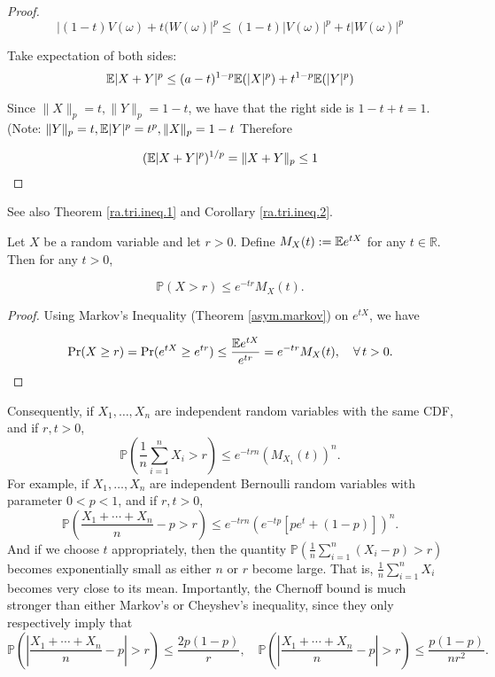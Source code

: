 \begin{itemize}
\begin{itemize}
\begin{theorem}
\begin{proof}
\[
|(1-t)V(\omega) + t(W(\omega)|^p \leq (1-t)|V(\omega)|^p + t|W(\omega)|^p
\]

Take expectation of both sides:
\[
\mathbb{E}|X+Y|^p \leq (a-t)^{1-p}\mathbb{E}(|X|^p) + t^{1-p}\mathbb{E}(|Y|^p)
\]

Since \(\lVert X\rVert_p = t, \lVert Y \rVert_p=1-t\), we have that the right side is \(1 - t + t = 1\). (Note: \(\lVert Y\rVert_p = t, \mathbb{E}|Y|^p = t^p, \lVert X\rVert_p = 1-t\) Therefore

\[
(\mathbb{E}|X+Y|^p)^{1/p} = \lVert X+Y\rVert_p \leq 1
\]

\end{proof}

\begin{remark} See also Theorem \ref{ra.tri.ineq.1} and Corollary \ref{ra.tri.ineq.2}. \end{remark}

\end{theorem}
\end{itemize}

\end{itemize}

\begin{theorem}
Let $X$ be a random variable and let $r>0$.  Define $M_{X}(t):= \mathbb{E} e^{tX}$ for any $t\in\mathbb{R}$. Then for any $t>0$,

\[
\mathbb{P}(X>r)\leq e^{-tr}M_{X}(t).
\]

\end{theorem}

\begin{proof} Using Markov's Inequality (Theorem \ref{asym.markov}) on \(e^{tX}\), we have

\[
\Pr (X\geq r) = \Pr (e^{tX} \geq e^{t r}) \leq \frac{\E e^{tX}}{e^{t r}}  = e^{-tr}M_{X}(t), \ \ \ \forall\,t>0.
\]

\end{proof}

\begin{remark}Consequently, if $X_{1},\ldots,X_{n}$ are independent random variables with the same CDF, and if $r,t>0$,
$$\mathbb{P}\left(\frac{1}{n}\sum_{i=1}^{n}X_{i}>r\right)\leq e^{-trn}(M_{X_{1}}(t))^{n}.$$
For example, if $X_{1},\ldots,X_{n}$ are independent Bernoulli random variables with parameter $0<p<1$,  and if $r,t>0$,
$$\mathbb{P}\left(\frac{X_{1}+\cdots+X_{n}}{n}-p>r\right)\leq e^{-trn}( e^{-tp}[pe^{t}+(1-p)])^{n}.$$
And if we choose $t$ appropriately, then the quantity $\mathbb{P}\left(\frac{1}{n}\sum_{i=1}^{n}(X_{i}-p)>r\right)$ becomes exponentially small as either $n$ or $r$ become large.  That is, $\frac{1}{n}\sum_{i=1}^{n}X_{i}$ becomes very close to its mean.  Importantly, the Chernoff bound is much stronger than either Markov's or Cheyshev's inequality, since they only respectively imply that
$$\mathbb{P}\left( \left|\frac{X_{1}+\cdots+X_{n}}{n}-p \right|>r\right)\leq \frac{2p(1-p)}{r},   %
\quad\mathbb{P}\left(\left|\frac{X_{1}+\cdots+X_{n}}{n}-p \right|>r\right)\leq \frac{p(1-p)}{nr^{2}}.$$ %
\end{remark}

